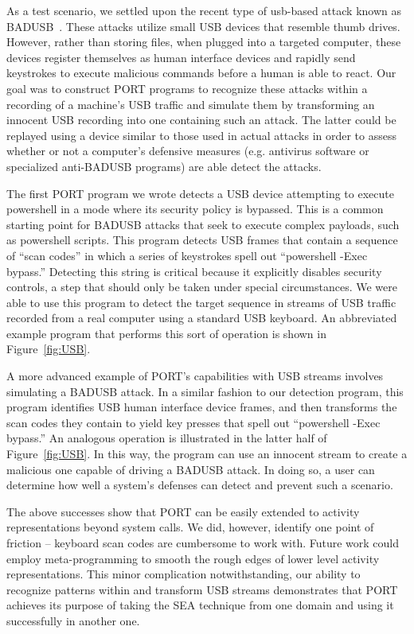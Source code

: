 As a test scenario, we settled upon the recent type of usb-based attack known as BADUSB~\cite{badusb}.
These attacks utilize small USB devices that resemble thumb drives. However, rather than storing files, when plugged into a targeted computer, these devices register themselves as human interface devices and rapidly send keystrokes to execute malicious commands before a human is able to react.
Our goal was to construct PORT programs to recognize these attacks within a recording of a machine’s USB traffic and simulate them by transforming an innocent USB recording into one containing such an attack.
The latter could be replayed using a device similar to those used in actual attacks in order to assess whether or not a computer’s defensive measures (e.g. antivirus software or specialized anti-BADUSB programs) are able detect the attacks. 

The first PORT program we wrote detects a USB device attempting to execute
powershell in a mode where its security policy is bypassed.
This is a common starting point for BADUSB attacks that seek to execute complex payloads, such as powershell scripts.
This program detects USB frames that contain a sequence of ``scan codes'' in which a series of keystrokes spell out ``powershell -Exec bypass.''
Detecting this string is critical because it explicitly disables security controls, a step that should only be taken under special circumstances.
We were able to use this program to detect the target sequence in streams of USB traffic recorded from a real computer using a standard USB keyboard.  An abbreviated example program that performs this sort of operation is shown in Figure~\ref{fig:USB}.

A more advanced example of PORT's capabilities with USB streams involves simulating a BADUSB attack.
In a similar fashion to our detection program, this program identifies USB human interface device frames, and then transforms the scan codes they contain to yield key presses that spell out ``powershell -Exec bypass.''
An analogous operation is illustrated in the latter half of Figure~\ref{fig:USB}.
In this way, the program can use an innocent stream to create a malicious one capable of driving a BADUSB attack. In doing so, a user can determine how well a system's defenses can detect and prevent such a scenario.

The above successes show that PORT can be easily extended to activity representations beyond system calls.
We did, however, identify one point of friction -- keyboard scan codes are cumbersome to work with.
Future work could employ meta-programming to smooth the rough edges of lower level activity representations.
This minor complication notwithstanding,
our ability to recognize patterns within and transform USB streams demonstrates
that PORT achieves its purpose of 
taking the SEA technique from one domain and using it successfully in another one.


